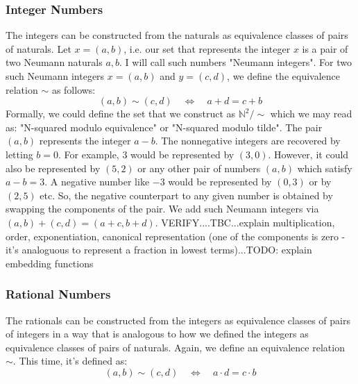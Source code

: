 
\subsubsection{Integer Numbers} The integers can be constructed from the naturals as equivalence classes of pairs of naturals. Let $x = (a,b)$, i.e. our set that represents the integer $x$ is a pair of two Neumann naturals $a,b$. I will call such numbers "Neumann integers". For two such Neumann integers $x = (a,b)$ and $y = (c,d)$, we define the equivalence relation $\sim$ as follows:
\begin{equation}
(a,b) \sim (c,d) \quad \Leftrightarrow  \quad a+d = c+b
\end{equation}
Formally, we could define the set that we construct as $\mathbb{N}^2 / \sim$ which we may read as: "N-squared modulo equivalence" or "N-squared modulo tilde". The pair $(a,b)$ represents the integer $a-b$. The nonnegative integers are recovered by letting $b = 0$. For example, $3$ would be represented by $(3,0)$. However, it could also be represented by $(5,2)$ or any other pair of numbers $(a,b)$ which satisfy $a-b = 3$. A negative number like $-3$ would be represented by $(0,3)$ or by $(2,5)$ etc. So, the negative counterpart to any given number is obtained by swapping the components of the pair. We add such Neumann integers via $(a,b)+(c,d) = (a+c,b+d)$. VERIFY....TBC...explain multiplication, order, exponentiation, canonical representation (one of the components is zero - it's analoguous to represent a fraction in lowest terms)...TODO: explain embedding functions





\subsubsection{Rational Numbers} The rationals can be constructed from the integers as equivalence classes of pairs of integers in a way that is analogous to how we defined the integers as equivalence classes of pairs of naturals. Again, we define an equivalence relation $\sim$. This time, it's defined as:
\begin{equation}
(a,b) \sim (c,d) \quad \Leftrightarrow  \quad a \cdot d = c \cdot b
\end{equation}

